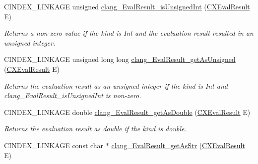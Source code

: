 \begin{DoxyCompactItemize}
\mbox{\label{group__CINDEX__MISC_gad72ab38051388e5ed607ce5ce890b2ac}} 
C\+I\+N\+D\+E\+X\+\_\+\+L\+I\+N\+K\+A\+GE unsigned \mbox{\hyperlink{group__CINDEX__MISC_gad72ab38051388e5ed607ce5ce890b2ac}{clang\+\_\+\+Eval\+Result\+\_\+is\+Unsigned\+Int}} (\mbox{\hyperlink{group__CINDEX__MISC_gaa9270afc68877e1f3b20ce5b343191bc}{C\+X\+Eval\+Result}} E)
\begin{DoxyCompactList}\small\item\em Returns a non-\/zero value if the kind is Int and the evaluation result resulted in an unsigned integer. \end{DoxyCompactList}\item 
\mbox{\label{group__CINDEX__MISC_ga448569d83b25514da4a15e6623d4bf4e}} 
C\+I\+N\+D\+E\+X\+\_\+\+L\+I\+N\+K\+A\+GE unsigned long long \mbox{\hyperlink{group__CINDEX__MISC_ga448569d83b25514da4a15e6623d4bf4e}{clang\+\_\+\+Eval\+Result\+\_\+get\+As\+Unsigned}} (\mbox{\hyperlink{group__CINDEX__MISC_gaa9270afc68877e1f3b20ce5b343191bc}{C\+X\+Eval\+Result}} E)
\begin{DoxyCompactList}\small\item\em Returns the evaluation result as an unsigned integer if the kind is Int and clang\+\_\+\+Eval\+Result\+\_\+is\+Unsigned\+Int is non-\/zero. \end{DoxyCompactList}\item 
\mbox{\label{group__CINDEX__MISC_ga6d140616208f61e24e18abf806aa68a7}} 
C\+I\+N\+D\+E\+X\+\_\+\+L\+I\+N\+K\+A\+GE double \mbox{\hyperlink{group__CINDEX__MISC_ga6d140616208f61e24e18abf806aa68a7}{clang\+\_\+\+Eval\+Result\+\_\+get\+As\+Double}} (\mbox{\hyperlink{group__CINDEX__MISC_gaa9270afc68877e1f3b20ce5b343191bc}{C\+X\+Eval\+Result}} E)
\begin{DoxyCompactList}\small\item\em Returns the evaluation result as double if the kind is double. \end{DoxyCompactList}\item 
\mbox{\label{group__CINDEX__MISC_ga4ee614153e0a52b470b864d3840fe7be}} 
C\+I\+N\+D\+E\+X\+\_\+\+L\+I\+N\+K\+A\+GE const char $\ast$ \mbox{\hyperlink{group__CINDEX__MISC_ga4ee614153e0a52b470b864d3840fe7be}{clang\+\_\+\+Eval\+Result\+\_\+get\+As\+Str}} (\mbox{\hyperlink{group__CINDEX__MISC_gaa9270afc68877e1f3b20ce5b343191bc}{C\+X\+Eval\+Result}} E)

\end{DoxyCompactItemize}
